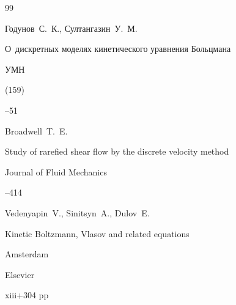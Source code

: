 \begin{thebibliography}{99}




\by Годунов~С.~К., Султангазин~У.~М.

\paper О~дискретных моделях кинетического уравнения Больцмана

\jour УМН



(159)

--51
















\by Broadwell~T.~E.

\paper Study of rarefied shear flow by the discrete velocity method

\jour  Journal of Fluid Mechanics




--414





\by Vedenyapin~V., Sinitsyn~A., Dulov~E.

\book Kinetic Boltzmann, Vlasov and related equations


\publaddr Amsterdam

\publ Elsevier 

\totalpages xiii+304 pp \nofrills



\end{thebibliography}
